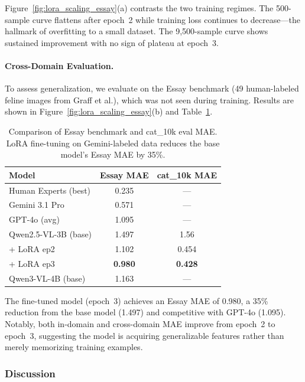 \documentclass[11pt,twocolumn]{article}
\begin{document}
Figure~\ref{fig:lora_scaling_essay}(a) contrasts the two training regimes. The 500-sample curve flattens after epoch~2 while training loss continues to decrease---the hallmark of overfitting to a small dataset. The 9{,}500-sample curve shows sustained improvement with no sign of plateau at epoch~3.

\paragraph{Cross-Domain Evaluation.}

To assess generalization, we evaluate on the Essay benchmark (49 human-labeled feline images from Graff et al.), which was not seen during training. Results are shown in Figure~\ref{fig:lora_scaling_essay}(b) and Table~\ref{tab:lora_essay}.

\begin{table}[t]
\centering
\small
\begin{tabular}{@{}lcc@{}}
\toprule
\textbf{Model} & \textbf{Essay MAE} & \textbf{cat\_10k MAE} \\
\midrule
Human Experts (best)        & 0.235 & --- \\
Gemini 3.1 Pro              & 0.571 & --- \\
GPT-4o (avg)                & 1.095 & --- \\
\midrule
Qwen2.5-VL-3B (base)       & 1.497 & 1.56 \\
\quad + LoRA ep2            & 1.102 & 0.454 \\
\quad + LoRA ep3            & \textbf{0.980} & \textbf{0.428} \\
\midrule
Qwen3-VL-4B (base)         & 1.163 & --- \\
\bottomrule
\end{tabular}
\caption{Comparison of Essay benchmark and cat\_10k eval MAE. LoRA fine-tuning on Gemini-labeled data reduces the base model's Essay MAE by 35\%.}
\label{tab:lora_essay}
\end{table}

The fine-tuned model (epoch~3) achieves an Essay MAE of 0.980, a 35\% reduction from the base model (1.497) and competitive with GPT-4o (1.095). Notably, both in-domain and cross-domain MAE improve from epoch~2 to epoch~3, suggesting the model is acquiring generalizable features rather than merely memorizing training examples.

\subsubsection{Discussion}
\end{document}
